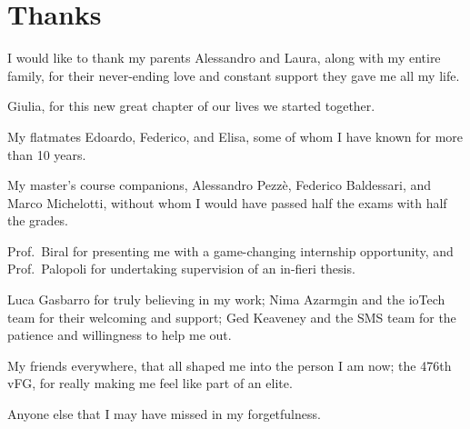 
\chapter*{Thanks}

I would like to thank my parents Alessandro and Laura, along with my entire family, for their never-ending love and constant support they gave me all my life.

\FLOATverticalspace{12px}

Giulia, for this new great chapter of our lives we started together.

\FLOATverticalspace{12px}

My flatmates Edoardo, Federico, and Elisa, some of whom I have known for more than 10 years.

\FLOATverticalspace{12px}

My master's course companions, Alessandro Pezzè, Federico Baldessari, and Marco Michelotti, without whom I would have passed half the exams with half the grades.

\FLOATverticalspace{12px}

Prof.\ Biral for presenting me with a game-changing internship opportunity, and Prof.\ Palopoli for undertaking supervision of an in-fieri thesis.

\FLOATverticalspace{12px}

Luca Gasbarro for truly believing in my work; Nima Azarmgin and the ioTech team for their welcoming and support; Ged Keaveney and the SMS team for the patience and willingness to help me out.

\FLOATverticalspace{12px}

My friends everywhere, that all shaped me into the person I am now; the 476th vFG, for really making me feel like part of an elite.

\FLOATverticalspace{12px}

Anyone else that I may have missed in my forgetfulness.
